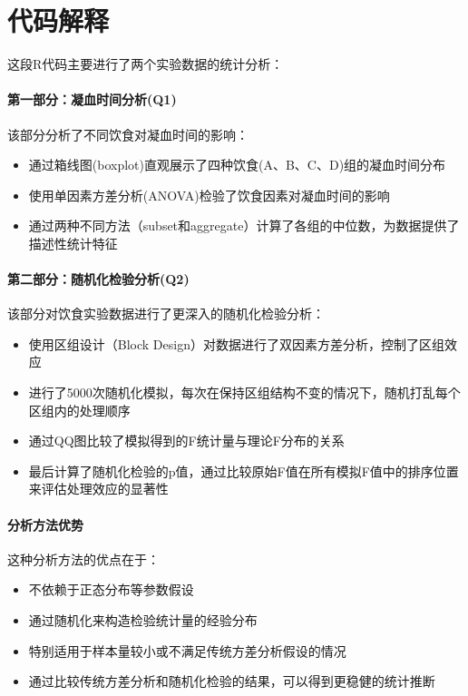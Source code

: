\documentclass[UTF8]{report}
\theoremstyle{MyLineTheoremStyle} %
\theoremstyle{MyBlockTheoremStyle} %
\theoremstyle{MySubsubsectionStyle} %
\begin{document}
\section*{代码解释}

这段R代码主要进行了两个实验数据的统计分析：

\paragraph{第一部分：凝血时间分析(Q1)}
该部分分析了不同饮食对凝血时间的影响：
\begin{itemize}
    \item 通过箱线图(boxplot)直观展示了四种饮食(A、B、C、D)组的凝血时间分布
    \item 使用单因素方差分析(ANOVA)检验了饮食因素对凝血时间的影响
    \item 通过两种不同方法（subset和aggregate）计算了各组的中位数，为数据提供了描述性统计特征
\end{itemize}

\paragraph{第二部分：随机化检验分析(Q2)}
该部分对饮食实验数据进行了更深入的随机化检验分析：
\begin{itemize}
    \item 使用区组设计（Block Design）对数据进行了双因素方差分析，控制了区组效应
    \item 进行了5000次随机化模拟，每次在保持区组结构不变的情况下，随机打乱每个区组内的处理顺序
    \item 通过QQ图比较了模拟得到的F统计量与理论F分布的关系
    \item 最后计算了随机化检验的p值，通过比较原始F值在所有模拟F值中的排序位置来评估处理效应的显著性
\end{itemize}

\paragraph{分析方法优势}
这种分析方法的优点在于：
\begin{itemize}
    \item 不依赖于正态分布等参数假设
    \item 通过随机化来构造检验统计量的经验分布
    \item 特别适用于样本量较小或不满足传统方差分析假设的情况
    \item 通过比较传统方差分析和随机化检验的结果，可以得到更稳健的统计推断
\end{itemize}
\end{document}
